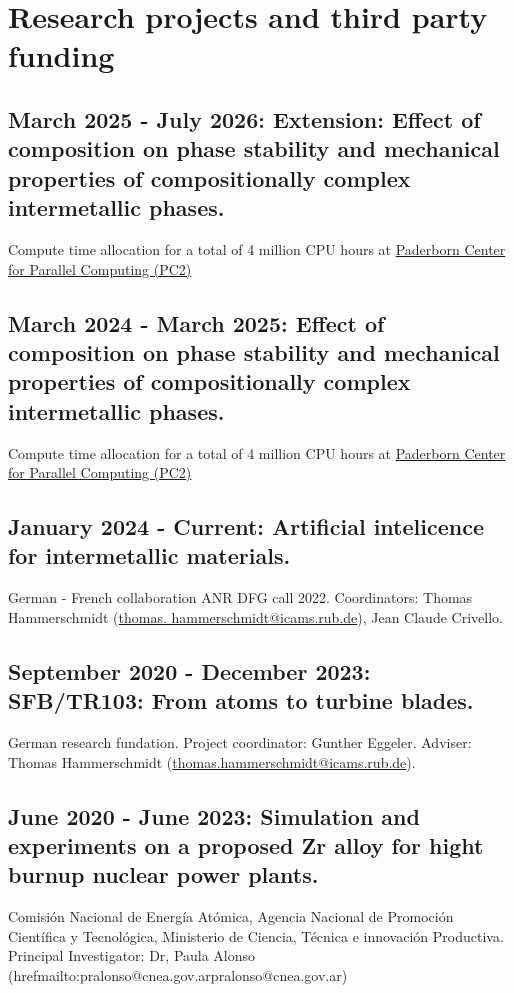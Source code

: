 \section{Research projects and third party funding}

\subsection{March 2025 - July 2026: Extension: Effect of composition on phase stability and mechanical properties of compositionally complex intermetallic phases. }
  Compute time allocation for a total of 4 million CPU hours at \href{https://pc2.uni-paderborn.de/}{Paderborn Center for Parallel Computing (PC2)}

  \subsection{March 2024 - March 2025: Effect of composition on phase stability and mechanical properties of compositionally complex intermetallic phases. }
  Compute time allocation for a total of 4 million CPU hours at \href{https://pc2.uni-paderborn.de/}{Paderborn Center
  for Parallel Computing (PC2)}

\subsection{January 2024 - Current: Artificial intelicence for intermetallic materials.}
German - French collaboration ANR DFG call 2022.
Coordinators: Thomas Hammerschmidt (\href{mailto:thomas.Hammerschmidt@icams.rub.de}{thomas. hammerschmidt@icams.rub.de}),
Jean Claude Crivello.

\subsection{September 2020 - December 2023: SFB/TR103: From atoms to turbine blades.}
German research fundation. 
Project coordinator: Gunther Eggeler. Adviser: Thomas Hammerschmidt (\href{mailto:thomas.Hammerschmidt@icams.rub.de}{thomas.hammerschmidt@icams.rub.de}).

\subsection{June 2020 - June 2023: Simulation and experiments on a proposed Zr alloy for hight burnup nuclear power plants.} 
Comisión Nacional de Energía Atómica, Agencia Nacional de Promoción Científica y Tecnológica, Ministerio de Ciencia, Técnica e innovación Productiva.
Principal Investigator: Dr, Paula Alonso (href{mailto:pralonso@cnea.gov.ar}{pralonso@cnea.gov.ar})

